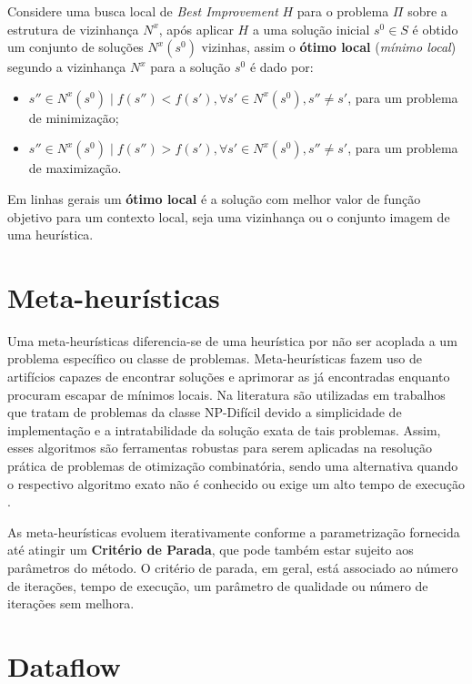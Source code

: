 Considere uma busca local de \textit{Best Improvement} $H$ para o problema $\Pi$ sobre a estrutura de vizinhança $N^x$, após aplicar $H$ a uma solução inicial $s^0 \in S$ é obtido um conjunto de soluções $N^x(s^0)$ vizinhas, assim o \textbf{ótimo local} (\textit{mínimo local}) segundo a vizinhança $N^x$ para a solução $s^0$ é dado por:
\begin{itemize}
    \item $s'' \in N^x(s^0) \mid f(s'') < f(s'), \forall s' \in N^x(s^0), s'' \neq s'$, para um problema de minimização;
    \item $s'' \in N^x(s^0) \mid f(s'') > f(s'), \forall s' \in N^x(s^0), s'' \neq s'$, para um problema de maximização.
\end{itemize}

Em linhas gerais um \textbf{ótimo local} é a solução com melhor valor de função objetivo para um contexto local, seja uma vizinhança ou o conjunto imagem de uma heurística.

\section{Meta-heurísticas} \label{sec:metaHeuristicas}

Uma meta-heurísticas diferencia-se de uma heurística por não ser acoplada a um problema específico ou classe de problemas.
Meta-heurísticas fazem uso de artifícios capazes de encontrar soluções e aprimorar as já encontradas enquanto procuram escapar de mínimos locais.
Na literatura são utilizadas em trabalhos que tratam de problemas da classe NP-Difícil devido a simplicidade de implementação e a intratabilidade da solução exata de tais problemas.
Assim, esses algoritmos são ferramentas robustas para serem aplicadas na resolução prática de problemas de otimização combinatória, sendo uma alternativa quando o respectivo algoritmo exato não é conhecido ou exige um alto tempo de execução \cite{glover2006handbook}.

As meta-heurísticas evoluem iterativamente conforme a parametrização fornecida até atingir um \textbf{Critério de Parada}, que pode também estar sujeito aos parâmetros do método.
O critério de parada, em geral, está associado ao número de iterações, tempo de execução, um parâmetro de qualidade ou número de iterações sem melhora.

\section{Dataflow} \label{sec:conceitosDataflow}

